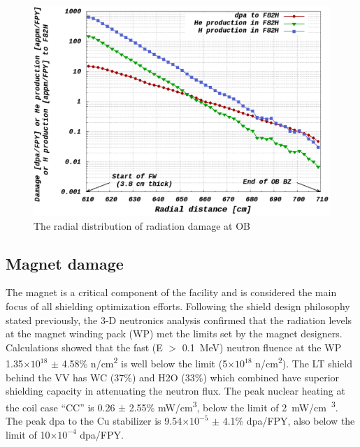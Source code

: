 \documentclass[12pt, letterpaper]{elsarticle}
\begin{document}
\begin{figure}[h!]
  \centering
  \includegraphics[scale=0.2]{../plots/radialdamage.png}
  \caption{The radial distribution of radiation damage at OB}
  \label{fig:Radial Damage}
\end{figure}

\subsection{Magnet damage} \label{Magnet damage}
\providecommand{\e}[1]{\ensuremath{\times 10^{#1}}}
The magnet is a critical component of the facility and is considered the main focus of all shielding optimization efforts. Following the shield design philosophy stated previously, the 3-D neutronics analysis confirmed that the radiation levels at the magnet winding pack (WP) met the limits set by the magnet designers. Calculations showed that the fast (E $>$ \SI{0.1}{MeV}) neutron fluence at the WP 1.35\e{18} $\pm$ 4.58\% n/cm\textsuperscript{2} is well below the limit (5\e{18} n/cm\textsuperscript{2}). The LT shield behind the VV has WC (37\%) and H2O (33\%) which combined have superior shielding capacity in attenuating the neutron flux. The peak nuclear heating at the coil case “CC” is 0.26 $\pm$ 2.55\% mW/cm\textsuperscript{3}, below the limit of \SI{2}{mW/cm\textsuperscript{3}}. The peak dpa to the Cu stabilizer is 9.54\e{-5} $\pm$ 4.1\% dpa/FPY, also below the limit of 10\e{-4} dpa/FPY.
\end{document}
